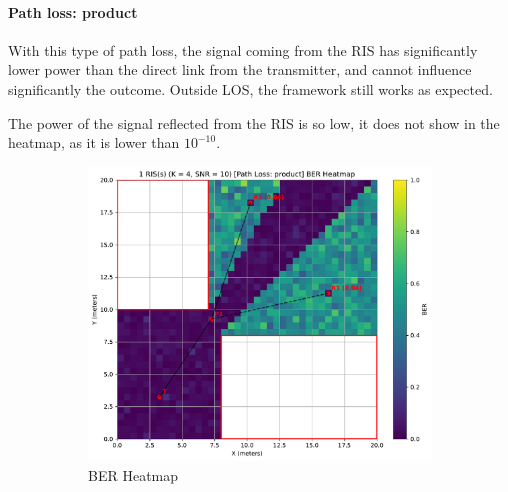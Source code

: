 \newpage
\paragraph*{Path loss: product}

With this type of path loss, the signal coming from the RIS has significantly lower power than the direct link from the transmitter, and cannot influence significantly the outcome. Outside LOS, the framework still works as expected.

The power of the signal reflected from the RIS is so low, it does not show in the heatmap, as it is lower than $10^{-10}$.

\begin{figure}[H]
  \centering
  \begin{subfigure}[b]{0.48\textwidth}
    \centering
    \includegraphics[width=\textwidth]{imgs/heatmap-simulations/1 RIS(s) (K = 4, SNR = 10) [Path Loss: product] BER Heatmap.pdf}
    \caption{BER Heatmap}
  \end{subfigure}
  \hfill
  \begin{subfigure}[b]{0.48\textwidth}
    \centering

\end{subfigure}
\end{figure}
